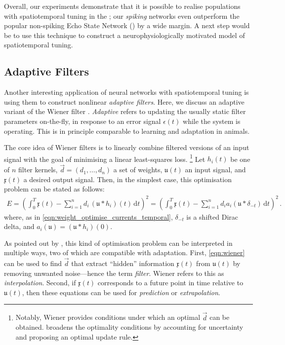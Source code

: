 Overall, our experiments demonstrate that it is possible to realise populations with spatiotemporal tuning in the \NEF; our \emph{spiking} networks even outperform the popular non-spiking Echo State Network (\cite{jaeger2004harnessing}) by a wide margin.
A next step would be to use this technique to construct a neurophysiologically motivated model of spatiotemporal tuning.

\pagebreak

\subsection{Adaptive Filters}
\label{sec:adaptive_filter}

Another interesting application of neural networks with spatiotemporal tuning is using them to construct nonlinear \emph{adaptive filters}.
Here, we discuss an adaptive variant of the Wiener filter \citep[Chapter~2]{wiener1949extrapolation,haykin2014adaptive}.
\emph{Adaptive} refers to updating the usually static filter parameters on-the-fly, in response to an error signal $\epsilon(t)$ while the system is operating.
This is in principle comparable to learning and adaptation in animals.

The core idea of Wiener filters is to linearly combine filtered versions of an input signal with the goal of minimising a linear least-squares loss.%
\footnote{Notably, Wiener provides conditions under which an optimal $\vec d$ can be obtained.
 broadens the optimality conditions by accounting for uncertainty and proposing an optimal update rule.}
Let $h_i(t)$ be one of $n$ filter kernels, $\vec d = (d_1, \ldots, d_n)$ a set of weights, $\mathfrak{u}(t)$ an input signal, and $\mathfrak{x}(t)$ a desired output signal.
Then, in the simplest case, this optimisation problem can be stated as follows:
\begin{align}
	E = \left( \int_0^T \!\! \mathfrak{x}(t) - \sum_{i = 1}^n d_i \, (\mathfrak{u} \ast h_i)(t) \, \mathrm{d}t \right)^2
	\! = \left( \int_0^T \!\! \mathfrak{x}(t) - \sum_{i = 1}^n d_i a_i(\mathfrak{u} \ast \delta_{-t}) \, \mathrm{d}t \right)^2 \,.
	\label{eqn:wiener}
\end{align}
where, as in \cref{eqn:weight_optimise_currents_temporal}, $\delta_{-t}$ is a shifted Dirac delta, and $a_i(\mathfrak{u}) = (\mathfrak{u} \ast h_i)(0)$.

As pointed out by , this kind of optimisation problem can be interpreted in multiple ways, two of which are compatible with adaptation.
First, \cref{eqn:wiener} can be used to find $\vec d$ that extract \enquote{hidden} information $\mathfrak{x}(t)$ from $\mathfrak{u}(t)$ by removing unwanted noise---hence the term \emph{filter}.
Wiener refers to this as \emph{interpolation}.
Second, if $\mathfrak{x}(t)$ corresponds to a future point in time relative to $\mathfrak{u}(t)$, then these equations can be used for \emph{prediction} or \emph{extrapolation}.

